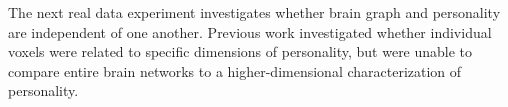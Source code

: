 \documentclass[11pt]{article}
\providecommand{\sct}[1]{{\sc \texttt{#1}}}
\newcommand{\Migraine}{\sct{Migraine}}
\newcommand{\mtg}{\sct{m2g}}
\newcommand{\Mgc}{\sct{Mgc}}
\newcommand{\Hhg}{\sct{Hhg}}
\newcommand{\Mantel}{\sct{Mantel}}
\begin{document}
The next real data experiment investigates whether brain graph and personality are independent of one another. Previous work \cite{AdelsteinEtAl2011} investigated whether individual voxels were related to specific dimensions of personality, but were unable to compare entire brain networks to a higher-dimensional characterization of personality.






\end{document}
